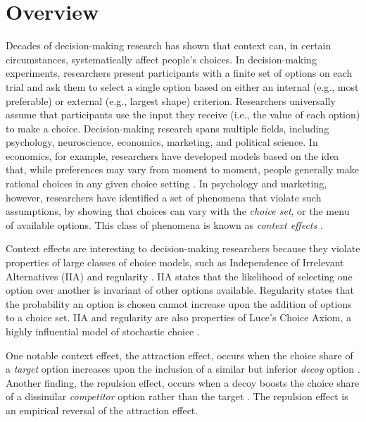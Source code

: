 \section{Overview}

Decades of decision-making research has shown that context can, in certain circumstances, systematically affect people's choices. In decision-making experiments, researchers present participants with a finite set of options on each trial and ask them to select a single option based on either an internal (e.g., most preferable) or external (e.g., largest shape) criterion. Researchers universally assume that participants use the input they receive (i.e., the value of each option) to make a choice. Decision-making research spans multiple fields, including psychology, neuroscience, economics, marketing, and political science. In economics, for example, researchers have developed models based on the idea that, while preferences may vary from moment to moment, people generally make rational choices in any given choice setting \parencite{mcfadden2001economic}. In psychology and marketing, however, researchers have identified a set of phenomena that violate such assumptions, by showing that choices can vary with the \textit{choice set}, or the menu of available options. This class of phenomena is known as \textit{context effects} .

Context effects are interesting to decision-making researchers because they violate properties of large classes of choice models, such as Independence of Irrelevant Alternatives (IIA) \parencite{ray1973independence} and regularity \parencite{mackay1995probabilistic,marley1989random}. IIA states that the likelihood of selecting one option over another is invariant of other options available. Regularity states that the probability an option is chosen cannot increase upon the addition of options to a choice set. IIA and regularity are also properties of Luce's Choice Axiom, a highly influential model of stochastic choice \parencite{luceChoiceAxiomTwenty1977a, luce1959individual}. 

One notable context effect, the attraction effect, occurs when the choice share of a \textit{target} option increases upon the inclusion of a similar but inferior \textit{decoy} option \parencite{huberAddingAsymmetricallyDominated1982d}. Another finding, the repulsion effect, occurs when a decoy boosts the choice share of a dissimilar \textit{competitor} option rather than the target \parencite{simonson2014vices}. The repulsion effect is an empirical reversal of the attraction effect. 

